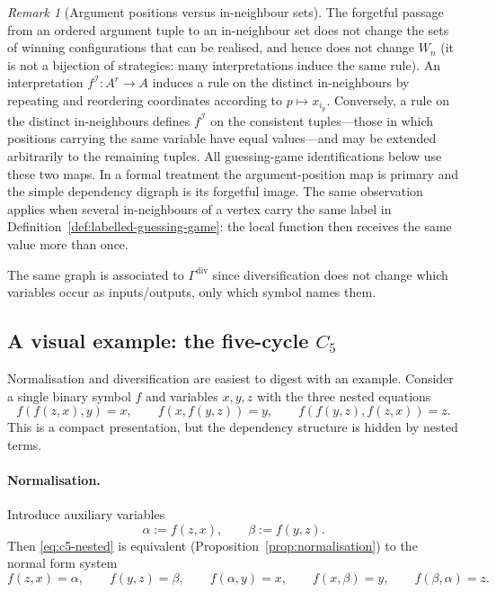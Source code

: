 \documentclass[11pt]{article}
\theoremstyle{plain}
\theoremstyle{definition}
\theoremstyle{definition}
\theoremstyle{remark}
\newtheorem{remark}[theorem]{Remark}
\newcommand{\A}{A}
\begin{document}
\begin{remark}[Argument positions versus in-neighbour sets]
\label{rem:argument-positions}
The forgetful passage from an ordered argument tuple to an in-neighbour set does not change
the sets of winning configurations that can be realised, and hence does not change $W_n$
(it is not a bijection of strategies: many interpretations induce the same rule).
An interpretation $f^{\mathcal I}:\A^r\to\A$ induces a rule on the distinct in-neighbours by repeating and
reordering coordinates according to $p\mapsto x_{i_p}$.  Conversely, a rule on the distinct in-neighbours defines
$f^{\mathcal I}$ on the consistent tuples---those in which positions carrying the same variable have equal
values---and may be extended arbitrarily to the remaining tuples.  All guessing-game identifications below use
these two maps.  In a formal treatment the argument-position map is primary and the simple dependency digraph is
its forgetful image.
The same observation applies when several in-neighbours of a vertex carry the same label in
Definition~\ref{def:labelled-guessing-game}: the local function then receives the same value
more than once.
\end{remark}

The same graph is associated to $\Gamma^{\mathrm{div}}$ since diversification does not change which variables
occur as inputs/outputs, only which symbol names them.

\subsection{A visual example: the five-cycle \texorpdfstring{$C_5$}{C5}}
\label{subsec:c5-visual}

Normalisation and diversification are easiest to digest with an example.
Consider a single binary symbol $f$ and variables $x,y,z$ with the three nested equations
\begin{equation}
\label{eq:c5-nested}
  f(f(z,x),y)=x,\qquad f(x,f(y,z))=y,\qquad f(f(y,z),f(z,x))=z.
\end{equation}
This is a compact presentation, but the dependency structure is hidden by nested terms.

\paragraph{Normalisation.}
Introduce auxiliary variables
\[
  \alpha := f(z,x),\qquad \beta := f(y,z).
\]
Then \eqref{eq:c5-nested} is equivalent (Proposition~\ref{prop:normalisation}) to the normal form system
\begin{equation}
\label{eq:c5-nf}
  f(z,x)=\alpha,\qquad f(y,z)=\beta,\qquad f(\alpha,y)=x,\qquad f(x,\beta)=y,\qquad f(\beta,\alpha)=z.
\end{equation}
\end{document}
